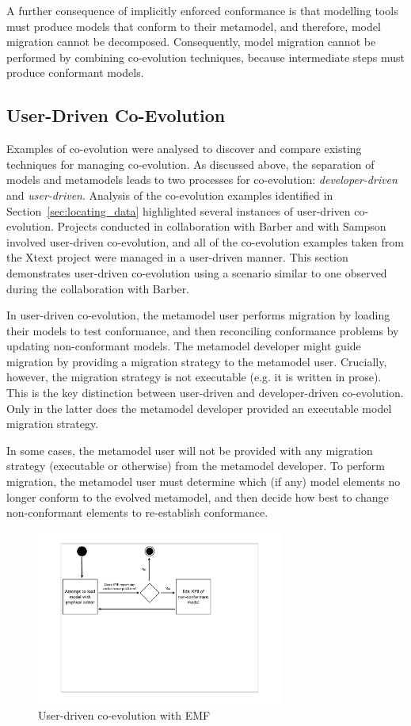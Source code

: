 A further consequence of implicitly enforced conformance is that modelling tools must produce models that conform to their metamodel, and therefore, model migration cannot be decomposed. Consequently, model migration cannot be performed by combining co-evolution techniques, because intermediate steps must produce conformant models.


\subsection{User-Driven Co-Evolution}
\label{subsec:user-driven_co-evolution}
Examples of co-evolution were analysed to discover and compare existing techniques for managing co-evolution. As discussed above, the separation of models and metamodels leads to two processes for co-evolution: \emph{developer-driven} and \emph{user-driven}. Analysis of the co-evolution examples identified in Section~\ref{sec:locating_data} highlighted several instances of user-driven co-evolution. Projects conducted in collaboration with Barber and with Sampson involved user-driven co-evolution, and all of the co-evolution examples taken from the Xtext project were managed in a user-driven manner. This section demonstrates user-driven co-evolution using a scenario similar to one observed during the collaboration with Barber.

In user-driven co-evolution, the metamodel user performs migration by loading their models to test conformance, and then reconciling conformance problems by updating non-conformant models. The metamodel developer might guide migration by providing a migration strategy to the metamodel user. Crucially, however, the migration strategy is not executable (e.g. it is written in prose). This is the key distinction between user-driven and developer-driven co-evolution. Only in the latter does the metamodel developer provided an executable model migration strategy.  

In some cases, the metamodel user will not be provided with any migration strategy (executable or otherwise) from the metamodel developer. To perform migration, the metamodel user must determine which (if any) model elements no longer conform to the evolved metamodel, and then decide how best to change non-conformant elements to re-establish conformance.

\begin{figure}[htbp]
	\centering
		\includegraphics*[viewport=80 280 600 550,height=5.75cm]{6.Evaluation/images/user_driven/emf_process.pdf}
	\caption{User-driven co-evolution with EMF}
	\label{fig:emf_process_analysis}
\end{figure}

